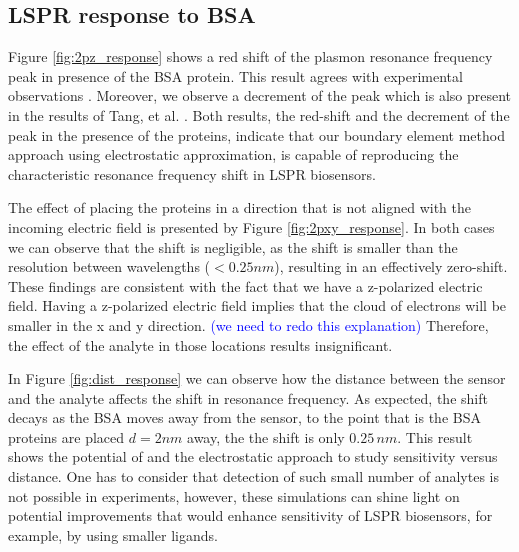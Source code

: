 \subsection{LSPR response to BSA}

Figure \ref{fig:2pz_response} shows a red shift of the plasmon resonance frequency peak in presence of the BSA protein.
This result agrees with experimental observations
\cite{TangETal2010, RaphaelETal2013}. Moreover, we observe a decrement of 
the peak which is also present in the results of Tang, et al. \cite{TangETal2010}.
Both results, the red-shift and the decrement of the peak in the presence of 
the proteins, indicate that our boundary element method approach using electrostatic
approximation, is capable of reproducing the characteristic resonance frequency 
shift in LSPR biosensors.

The effect of placing the proteins in a direction that is not aligned with the incoming electric field
is presented by Figure \ref{fig:2pxy_response}. In both cases we can observe that the shift is negligible, 
as the shift is smaller than the resolution between wavelengths ($< 0.25 nm$), resulting in an
effectively zero-shift. These findings are consistent with 
the fact that we have a z-polarized electric field. Having a z-polarized electric
field implies that the cloud of electrons will be smaller in the x and y direction.
\textcolor{blue}{(we need to redo this explanation)}
Therefore, the effect of the analyte in those locations results insignificant. 

In Figure \ref{fig:dist_response} we can observe how the distance between the sensor 
and the analyte affects the shift in resonance frequency. As expected, the shift decays 
as the BSA moves away from the sensor, to the point that is the BSA proteins are placed
$d=2 nm$ away, the the shift is only $0.25 \, nm$. This result shows the potential of \pygbe 
and the electrostatic approach to study sensitivity versus distance.
One has to consider that detection of such
small number of analytes is not possible in experiments, however, these simulations can shine light on
potential improvements that would enhance sensitivity of LSPR biosensors, for example, by using
smaller ligands. 



